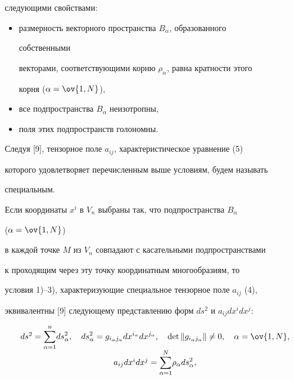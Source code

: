 следующими свойствами: 


\begin{itemize} 


\item[1)] размерность векторного пространства $B_\alpha$, образованного 


собственными 


векторами, соответствующими корню $\rho_\alpha$, равна кратности этого 


корня ($\alpha=\ov{1,N}$), 


\item[2)] все подпространства $B_\alpha$ неизотропны, 


\item[3)] поля этих подпространств голономны. 


\end{itemize} 


 


Следуя [9], тензорное поле $a_{ij}$, характеристическое уравнение (5) 


которого удовлетворяет перечисленным выше условиям, будем называть 


специальным. 


 


Если координаты $x^i$ в $V_n$ выбраны так, что подпространства $B_\alpha$ 


($\alpha=\ov{1,N}$) 


в каждой точке $M$ из $V_n$ совпадают с касательными подпространствами 


к проходящим через эту точку координатным многообразиям, то 


условия 1)--3), характеризующие специальное тензорное поле $a_{ij}$ (4), 


эквивалентны [9] следующему представлению форм $ds^2$ и $a_{ij}dx^i 


dx^j$: 


\begin{equation} 


\begin{array}{c} 


ds^2=\displaystyle{\sum^n_{\alpha=1}}ds^2_\alpha,\quad 


ds^2_\alpha=g_{i_\alpha j_\alpha}dx^{i_\alpha} 


dx^{j_\alpha},\quad \det\|g_{i_\alpha j_\alpha}\|\ne0,\quad 


\alpha=\ov{1,N},\\[3mm] 


% 


a_{ij}dx^i dx^j=\displaystyle{\sum^N_{\alpha=1}} 


\rho_\alpha ds^2_\alpha, 


\end{array} 


\end{equation} 


